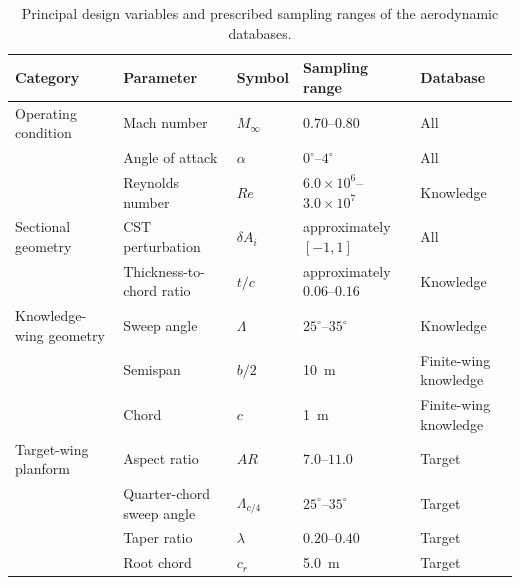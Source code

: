 \begin{table}[htbp]
    \centering
    \caption{Principal design variables and prescribed sampling ranges of the
    aerodynamic databases.}
    \label{tab:design-space}
    \begin{tabular}{lllll}
        \hline
        Category
        & Parameter
        & Symbol
        & Sampling range
        & Database \\
        \hline

        Operating condition
        & Mach number
        & $M_\infty$
        & $0.70$--$0.80$
        & All \\

        & Angle of attack
        & $\alpha$
        & $0^\circ$--$4^\circ$
        & All \\

        & Reynolds number
        & $Re$
        & $6.0\times10^{6}$--$3.0\times10^{7}$
        & Knowledge \\

        \hline

        Sectional geometry
        & CST perturbation
        & $\delta A_i$
        & approximately $[-1,1]$
        & All \\

        & Thickness-to-chord ratio
        & $t/c$
        & approximately $0.06$--$0.16$
        & Knowledge \\

        \hline

        Knowledge-wing geometry
        & Sweep angle
        & $\Lambda$
        & $25^\circ$--$35^\circ$
        & Knowledge \\

        & Semispan
        & $b/2$
        & \SI{10}{m}
        & Finite-wing knowledge \\

        & Chord
        & $c$
        & \SI{1}{m}
        & Finite-wing knowledge \\

        \hline

        Target-wing planform
        & Aspect ratio
        & $AR$
        & $7.0$--$11.0$
        & Target \\

        & Quarter-chord sweep angle
        & $\Lambda_{c/4}$
        & $25^\circ$--$35^\circ$
        & Target \\

        & Taper ratio
        & $\lambda$
        & $0.20$--$0.40$
        & Target \\

        & Root chord
        & $c_r$
        & \SI{5.0}{m}
        & Target \\

        \hline
    \end{tabular}
\end{table}